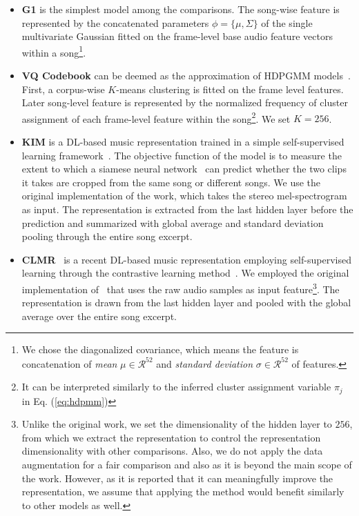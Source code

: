 \documentclass{article}
\begin{document}
\begin{itemize}[noitemsep, leftmargin=*]
    \item \textbf{G1} is the simplest model among the comparisons. The song-wise feature is represented by the concatenated parameters $\phi = \{\mu, \Sigma\}$ of the single multivariate Gaussian fitted on the frame-level base audio feature vectors within a song\footnote{We chose the diagonalized covariance, which means the feature is concatenation of \emph{mean} $\mu\in\mathcal{R}^{52}$ and \emph{standard deviation} $\sigma\in\mathcal{R}^{52}$ of features.}.

    \item \textbf{VQ Codebook} can be deemed as the approximation of HDPGMM models~\cite{DBLP:conf/ismir/HoffmanBC08}. First, a corpus-wise $K$-means clustering is fitted on the frame level features. Later song-level feature is represented by the normalized frequency of cluster assignment of each frame-level feature within the song\footnote{It can be interpreted similarly to the inferred cluster assignment variable $\pi_{j}$ in Eq. (\ref{eq:hdpmm})}. We set $K=256$.

    \item \textbf{KIM} is a DL-based music representation trained in a simple self-supervised learning framework~\cite{DBLP:journals/nca/KimULH20}. The objective function of the model is to measure the extent to which a siamese neural network~\cite{koch2015siamese} can predict whether the two clips it takes are cropped from the same song or different songs. We use the original implementation of the work, which takes the stereo mel-spectrogram as input. The representation is extracted from the last hidden layer before the prediction and summarized with global average and standard deviation pooling through the entire song excerpt.

    \item \textbf{CLMR}~\cite{DBLP:conf/ismir/SpijkervetB21} is a recent DL-based music representation employing self-supervised learning through the contrastive learning method~\cite{DBLP:conf/icml/ChenK0H20}. We employed the original implementation of~\cite{DBLP:conf/ismir/SpijkervetB21} that uses the raw audio samples as input feature\footnote{Unlike the original work, we set the dimensionality of the hidden layer to $256$, from which we extract the representation to control the representation dimensionality with other comparisons. Also, we do not apply the data augmentation for a fair comparison and also as it is beyond the main scope of the work. However, as it is reported that it can meaningfully improve the representation, we assume that applying the method would benefit similarly to other models as well.}. The representation is drawn from the last hidden layer and pooled with the global average over the entire song excerpt.


\end{itemize}
\end{document}
